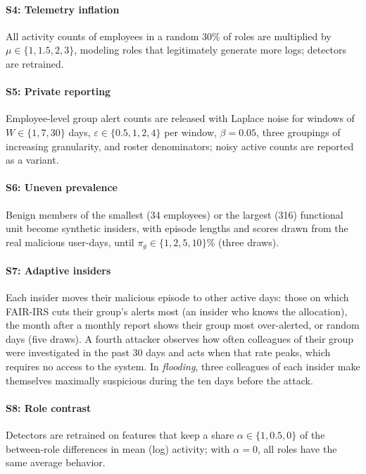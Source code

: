 \documentclass[10pt,onecolumn,letterpaper]{article}
\begin{document}
\paragraph{S4: Telemetry inflation} All activity counts of employees in a random 30\% of roles are multiplied by $\mu\in\{1,1.5,2,3\}$, modeling roles that legitimately generate more logs; detectors are retrained.

\paragraph{S5: Private reporting} Employee-level group alert counts are released with Laplace noise for windows of $W\in\{1,7,30\}$ days, $\varepsilon\in\{0.5,1,2,4\}$ per window, $\beta=0.05$, three groupings of increasing granularity, and roster denominators; noisy active counts are reported as a variant.

\paragraph{S6: Uneven prevalence} Benign members of the smallest (34 employees) or the largest (316) functional unit become synthetic insiders, with episode lengths and scores drawn from the real malicious user-days, until $\pi_g\in\{1,2,5,10\}\%$ (three draws).

\paragraph{S7: Adaptive insiders} Each insider moves their malicious episode to other active days: those on which FAIR-IRS cuts their group's alerts most (an insider who knows the allocation), the month after a monthly report shows their group most over-alerted, or random days (five draws). A fourth attacker observes how often colleagues of their group were investigated in the past 30 days and acts when that rate peaks, which requires no access to the system. In \emph{flooding}, three colleagues of each insider make themselves maximally suspicious during the ten days before the attack.

\paragraph{S8: Role contrast} Detectors are retrained on features that keep a share $\alpha\in\{1,0.5,0\}$ of the between-role differences in mean (log) activity; with $\alpha=0$, all roles have the same average behavior.
\end{document}
